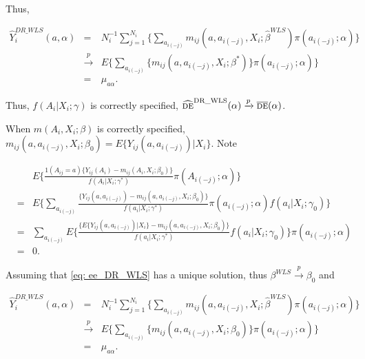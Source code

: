 \documentclass[oupdraft]{bio}
\begin{document}
Thus, 

\begin{eqnarray*}
 \widehat{Y}_i^{DR\_WLS}(a,\alpha)&=&N_i^{-1}\sum_{j=1}^{N_i}\Biggl\{\sum_{a_{i(-j)}}m_{ij}(a,a_{i(-j)},X_i;\hat\beta^{WLS})\pi(a_{i(-j)};\alpha)
 \Biggr\}\\
 &\xrightarrow{p}&E\Biggl\{\sum_{a_{i(-j)}}\{m_{ij}(a,a_{i(-j)},X_i;\beta^{\ast})\}
  \pi(a_{i(-j)};\alpha)\biggr\}\\
  &=&\mu_{a\alpha}.
\end{eqnarray*}

\noindent Thus, $f(A_i|X_i;\gamma)$ is correctly specified, $\widehat{\textsc{de}}^{\text{DR\_WLS}}(\alpha)\xrightarrow{p}\overline{\textsc{de}}(\alpha)$.

When $m(A_i,X_i;\beta)$ is correctly specified, $m_{ij}(a,a_{i(-j)},X_i;\beta_0)=E\{Y_{ij}(a,a_{i(-j)})|X_i\}$. Note

\begin{eqnarray*}
  &&E\Biggl\{\frac{1(A_{ij}=a)\{Y_{ij}(A_i)-m_{ij}(A_i,X_i;\beta_0)\}}{{f}(A_i|X_i;\gamma^{\ast})}
  \pi(A_{i(-j)};\alpha)\biggr\}\\
    &=&E\Biggl\{\sum_{a_{i(-j)}}\frac{\{Y_{ij}(a,a_{i(-j)})-m_{ij}(a,a_{i(-j)},X_i;\beta_0)\}}{{f}(a_i|X_i;\gamma^{\ast})}
  \pi(a_{i(-j)};\alpha){f}(a_i|X_i;\gamma_0)\biggr\}\\
    &=&\sum_{a_{i(-j)}}E\Biggl\{\frac{\bigl\{E\{Y_{ij}(a,a_{i(-j)})|X_i\}-m_{ij}(a,a_{i(-j)},X_i;\beta_0)\bigr\}}{{f}(a_i|X_i;\gamma^{\ast})}
  {f}(a_i|X_i;\gamma_0)\biggr\}\pi(a_{i(-j)};\alpha)\\
  &=&0.
\end{eqnarray*}

\noindent Assuming that \eqref{eq: ee_DR_WLS} has a unique solution, thus $\beta^{WLS}\xrightarrow{p}\beta_0$ and 

\begin{eqnarray*}
 \widehat{Y}_i^{DR\_WLS}(a,\alpha)&=&N_i^{-1}\sum_{j=1}^{N_i}\Biggl\{\sum_{a_{i(-j)}}m_{ij}(a,a_{i(-j)},X_i;\hat\beta^{WLS})\pi(a_{i(-j)};\alpha)
 \Biggr\}\\
 &\xrightarrow{p}&E\Biggl\{\sum_{a_{i(-j)}}\{m_{ij}(a,a_{i(-j)},X_i;\beta_0)\}
  \pi(a_{i(-j)};\alpha)\biggr\}\\
  &=&\mu_{a\alpha}.
\end{eqnarray*}
\end{document}
